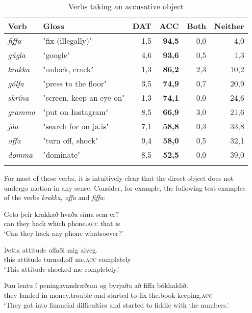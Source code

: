 \documentclass[output=paper,modfonts,nonflat,colorlinks,citecolor=brown]{langsci/langscibook}
\begin{document}
\begin{table}
{\caption{\label{tab:jonsson:3}Verbs taking an accusative object} }
\begin{tabularx}{\textwidth}{Xlrrrr}
\lsptoprule
Verb & Gloss & DAT & \textbf{ACC} & Both & Neither\\
\midrule
\textit{fiffa} & ʽfix (illegally)ʼ & 1,5 & \textbf{94,5} & 0,0 & 4,0\\
\textit{gúgla} & ʽgoogleʼ & 4,6 & \textbf{93,6} & 0,5 & 1,3\\
\textit{krakka} & ʽunlock, crackʼ & 1,3 & \textbf{86,2} & 2,3 & 10,2\\
\textit{gólfa} & ʽpress to the floorʼ & 3,5 & \textbf{74,9} & 0,7 & 20,9\\
\textit{skrína} & ʽscreen, keep an eye onʼ & 1,3 & \textbf{74,1} & 0,0 & 24,6\\
\textit{gramma} & ʽput on Instagramʼ & 8,5 & \textbf{66,9} & 3,0 & 21,6\\
\textit{jáa} & ʽsearch for on ja.isʼ & 7,1 & \textbf{58,8} & 0,3 & 33,8\\
\textit{offa} & ʽturn off, shockʼ & 9,4 & \textbf{58,0} & 0,5 & 32,1\\
\textit{domma} & ʽdominateʼ & 8,5 & \textbf{52,5} & 0,0 & 39,0\\
\lspbottomrule
\end{tabularx}
\end{table}

For most of these verbs, it is intuitively clear that the direct object does not undergo motion in any sense. Consider, for example, the following test examples of the verbs \textit{krakka}, \textit{offa} and \textit{fiffa}:


\ea%
    \label{ex:jonsson:5}
\ea
\gll  Geta  þeir  krakkað  hvaða  síma  sem  er?\\
   can  they  hack  which  phone.\textsc{acc}  that  is\\
\glt `Can they hack any phone whatsoever?'

\ex
\gll   Þetta  attitude  offaði  mig   alveg.\\
 this  attitude  turned.off  me.\textsc{acc}   completely\\
   \glt`This attitude shocked me completely.'


\ex
\gll   Þau  lentu  í  peningavandræðum  og  byrjuðu  að  fiffa  bókhaldið.\\
 they  landed  in  money.trouble  and  started  to  fix  the.book-keeping.\textsc{acc}\\
\glt `They got into financial difficulties and started to fiddle with the numbers.'
\z
\z
\end{document}
